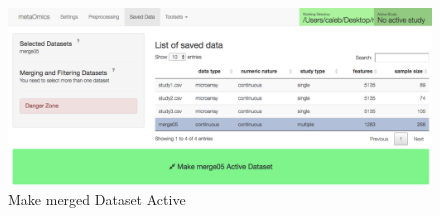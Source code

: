 \begin{figure}[H]
\begin{center}
\includegraphics[scale=0.7]{./figure/preprocessing/GUImarkActive}
\caption{Make merged Dataset Active}
\label{fig:active}
\end{center}
\end{figure}




